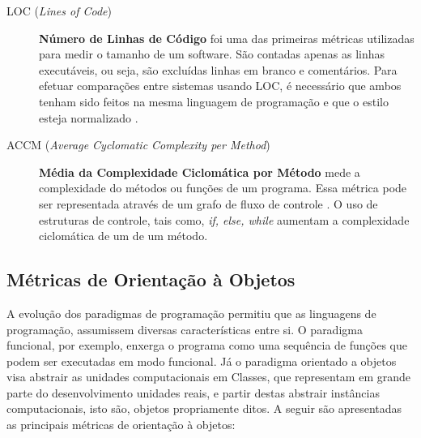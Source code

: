 \begin{description}

	\item[LOC (\textit{Lines of Code})] \textbf{Número de Linhas de Código} 
	foi uma das primeiras métricas utilizadas para medir o tamanho de um 
	software. São contadas apenas as linhas executáveis, ou seja, são excluídas 
	linhas em branco e comentários. Para efetuar comparações entre sistemas 
	usando LOC, é necessário que ambos tenham sido feitos na mesma linguagem de 
	programação e que o estilo esteja normalizado \cite{Jones91}.
	
	\item[ACCM (\textit{Average Cyclomatic Complexity per Method})] \textbf{
	Média da Complexidade Ciclomática por Método} mede a complexidade do 
	métodos ou funções de um programa. Essa métrica pode ser representada 
	através de um grafo de fluxo de controle \cite{McCabe76}. O uso de 
	estruturas de controle, tais como, \textit{if, else, while} aumentam a 
	complexidade ciclomática de um de um método.

\end{description}




\subsection{Métricas de Orientação à Objetos}
\label{métrica objetos}

A evolução dos paradigmas de programação permitiu que as linguagens de 
programação, assumissem diversas características entre si. O paradigma 
funcional, por exemplo, enxerga o programa como uma sequência de funções que 
podem ser executadas em modo funcional. Já o paradigma orientado a objetos visa 
abstrair as unidades computacionais em Classes, que representam em grande 
parte do desenvolvimento unidades reais, e partir destas abstrair instâncias 
computacionais, isto são, objetos propriamente ditos. A seguir são apresentadas 
as principais métricas de orientação à objetos:

